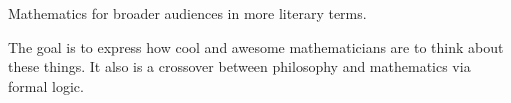 \documentclass{report}
\begin{document}
\begin{description}
\begin{mdframed}
\begin{itemize}
\begin{mdframed}
                        Mathematics for broader audiences
                        in more literary terms.

                        The goal is to express how cool and awesome
                        mathematicians are to think about these things.
                        It also is a crossover between philosophy
                        and mathematics via formal logic.
                    \end{mdframed}
            \end{itemize}
        \end{mdframed}
\end{description}
\end{document}
